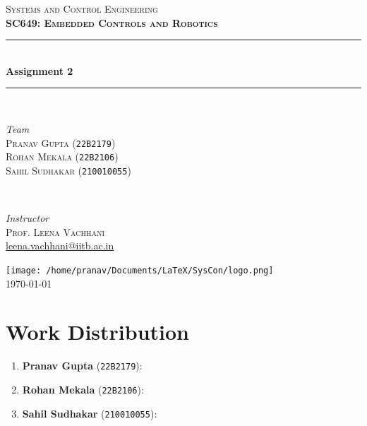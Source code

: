 \documentclass[12pt]{article}
\begin{document}
\begin{titlepage}
	\newcommand{\HRule}{\rule{\linewidth}{0.5mm}}
	\center
	
	\textsc{\Huge Systems and Control Engineering}\\[1.5cm]	
	\textsc{\LARGE\bfseries SC649: Embedded Controls and Robotics}\\[1cm] %
	
	\HRule\\[0.4cm]	
	{\huge\bfseries Assignment 2}\\[0.2cm] %
	\HRule\\[1.5cm]
	
	\begin{minipage}{0.4\textwidth}
		\begin{flushleft}
			\large
			\textit{Team}\\
			\textsc{Pranav Gupta} (\texttt{22B2179})\\
			\textsc{Rohan Mekala} (\texttt{22B2106})\\
			\textsc{Sahil Sudhakar} (\texttt{210010055})\\
		\end{flushleft}
	\end{minipage}
	~
	\begin{minipage}{0.4\textwidth}
		\begin{flushright}
			\large
			\textit{Instructor}\\
			\textsc{Prof. Leena Vachhani}\\
            \href{mailto:leena.vachhani@iitb.ac.in}{leena.vachhani@iitb.ac.in}
		\end{flushright}
	\end{minipage}
	
	\vfill\vfill\vfill
	\texttt{[image: /home/pranav/Documents/LaTeX/SysCon/logo.png]}\\[1cm]
	
	\vfill\vfill
	{\LARGE \today}
	\vfill
	
\end{titlepage}

\pagebreak
\tableofcontents

\section*{Work Distribution}
\begin{enumerate}
	\item \textbf{Pranav Gupta} (\texttt{22B2179}): 
	\item \textbf{Rohan Mekala} (\texttt{22B2106}): 
	\item \textbf{Sahil Sudhakar} (\texttt{210010055}):
\end{enumerate}
\end{document}
